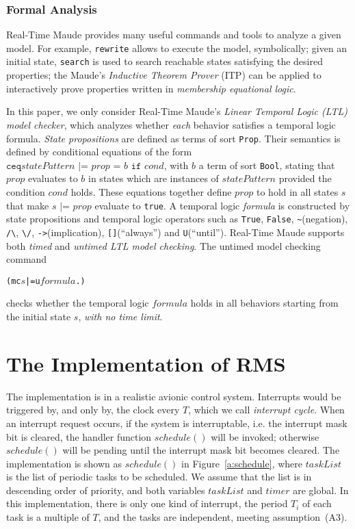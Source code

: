 \documentclass[10pt,journal]{IEEEtran}
\begin{document}
\subsubsection{Formal Analysis}
Real-Time Maude provides many useful commands and tools to analyze a
given model. For example, \verb|rewrite| allows to execute the model,
symbolically; given an initial state, \verb|search| is used to search
reachable states satisfying the desired properties; the Maude's
\emph{Inductive Theorem Prover} (ITP) can be applied to interactively
prove properties written in \emph{membership equational logic}.

In this paper, we only consider Real-Time Maude's \emph{Linear
  Temporal Logic (LTL) model checker}, which analyzes whether
\emph{each} behavior satisfies a temporal logic formula. \emph{State
  propositions} are defined as terms of sort \verb|Prop|. Their
semantics is defined by conditional equations of the form $\texttt{ceq
} statePattern \texttt{ |= } prop \texttt{ = } b \texttt{ if } cond$,
with $b$ a term of sort \verb|Bool|, stating that $prop$ evaluates to
$b$ in states which are instances of $statePattern$ provided the
condition $cond$ holds. These equations together define $prop$ to hold
in all states $s$ that make $s \texttt{ |= } prop$ evaluate to
\verb|true|. A temporal logic \emph{formula} is constructed by state
propositions and temporal logic operators such as \verb|True|,
\verb|False|, \verb|~|(negation), \verb|/\|, \verb|\/|,
\verb|->|(implication), \verb|[]|(``always'') and
\verb|U|(``until''). Real-Time Maude supports both \emph{timed} and
\emph{untimed LTL model checking}. The untimed model checking command
\begin{alltt}
  (mc \(s\) |=u \(formula\) .)
\end{alltt}
checks whether the temporal logic $formula$ holds in all behaviors
starting from the initial state $s$, \emph{with no time limit}.


\section{The Implementation of RMS}
\label{s:imp}
The implementation is in a realistic avionic control system.
Interrupts would be triggered by, and only by, the clock every $T$,
which we call \emph{interrupt cycle}. When an interrupt request
occurs, if the system is interruptable, i.e. the interrupt mask bit
is cleared, the handler function $schedule()$ will be invoked;
otherwise $schedule()$ will be pending until the interrupt mask bit
becomes cleared.  The implementation is shown as $schedule()$ in
Figure~\ref{a:schedule}, where $taskList$ is the list of periodic
tasks to be scheduled. We assume that the list is in descending order
of priority, and both variables $taskList$ and $timer$ are global. In
this implementation, there is only one kind of interrupt, the period
$T_i$ of each task is a multiple of $T$, and the tasks are
independent, meeting assumption~(A3).
\end{document}
